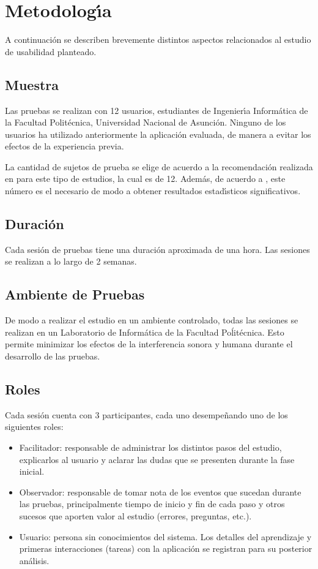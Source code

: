 \section{Metodolog{\'\i}a}
\label{sec:metodolog{\'\i}a}
A continuaci\'on se describen brevemente distintos aspectos relacionados al
estudio de usabilidad planteado.

\subsection{Muestra}
Las pruebas se realizan con 12 usuarios, estudiantes de Ingenier{\'\i}a Inform\'atica
de la Facultad Polit\'ecnica, Universidad Nacional de Asunci\'on. Ninguno de los usuarios 
ha utilizado anteriormente la aplicaci\'on evaluada, de manera a evitar los efectos
de la experiencia previa.

La cantidad de sujetos de prueba se elige de acuerdo a la recomendaci\'on realizada
en \cite{Hwang:2010} para este tipo de estudios, la cual es de 12. 
Adem\'as, de acuerdo a \cite[p.~267]{Rubin2008}, este n\'umero es el necesario de modo a obtener
resultados estad{\'\i}sticos significativos.

\subsection{Duraci\'on}
Cada sesi\'on de pruebas tiene una duraci\'on aproximada de una hora.
Las sesiones se realizan a lo largo de 2 semanas.

\subsection{Ambiente de Pruebas}
De modo a realizar el estudio en un ambiente controlado, todas las sesiones se
realizan en un Laboratorio de Inform\'atica de la Facultad Poĺit\'ecnica. Esto
permite minimizar los efectos de la interferencia sonora y humana durante el
desarrollo de las pruebas.

\subsection{Roles}
Cada sesi\'on cuenta con 3 participantes, cada uno desempeñando uno de los siguientes roles:
	\begin{itemize}
		\item Facilitador: responsable de administrar los distintos pasos del estudio, explicarlos al usuario 
		y aclarar las dudas que se presenten durante la fase inicial. 
		\item Observador: responsable de tomar nota de los eventos que sucedan durante las pruebas, principalmente
		tiempo de inicio y fin de cada paso y otros sucesos que aporten valor al estudio (errores, preguntas, etc.).
		\item Usuario: persona sin conocimientos del sistema. Los detalles del aprendizaje y primeras interacciones
		(tareas) con la aplicaci\'on se registran para su posterior an\'alisis.	
	\end{itemize}

